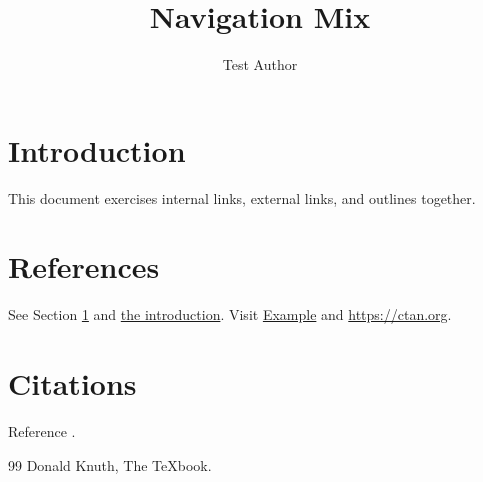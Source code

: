 \documentclass{article}
\title{Navigation Mix}
\author{Test Author}
\begin{document}
\tableofcontents

\section{Introduction}\label{sec:intro}
This document exercises internal links, external links, and outlines together.

\section{References}\label{sec:refs}
See Section \ref{sec:intro} and \hyperref[sec:intro]{the introduction}.
Visit \href{https://example.com}{Example} and \url{https://ctan.org}.

\section{Citations}\label{sec:cites}
Reference \cite{knuth}.

\begin{thebibliography}{99}
 Donald Knuth, The TeXbook.
\end{thebibliography}
\end{document}
